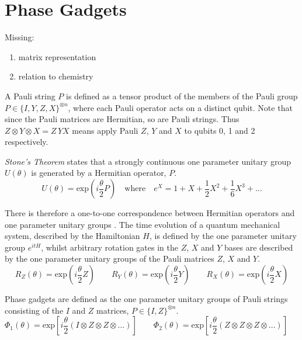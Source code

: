 \section{Phase Gadgets}
Missing:
\begin{enumerate}
    \item matrix representation
    \item relation to chemistry

\end{enumerate}

A Pauli string $P$ is defined as a tensor product of the members of the Pauli group $P \in \{I, Y, Z, X\}^{\otimes n}$, where each Pauli operator acts on a distinct qubit. Note that since the Pauli matrices are Hermitian, so are Pauli strings. Thus $Z \otimes Y \otimes X = Z \, YX$ means apply Pauli $Z$, $Y$ and $X$ to qubits 0, 1 and 2 respectively.

\textit{Stone's Theorem} \cite{Stone1932} states that a strongly continuous one parameter unitary group $U(\theta)$ is generated by a Hermitian operator, $P$.
\begin{equation*}
    U(\theta) = \text{exp}\left(i \frac{\theta}{2} P \right)
    \quad \text{where} \quad
    e^X = 1 + X + \frac{1}{2} X^2 + \frac{1}{6} X^3 + \dots
\end{equation*}

There is therefore a one-to-one correspondence between Hermitian operators and one parameter unitary groups \cite{Yeung2020}. The time evolution of a quantum mechanical system, described by the Hamiltonian $H$, is defined by the one parameter unitary group $e^{itH}$, whilst arbitrary rotation gates in the $Z$, $X$ and $Y$ bases are described by the one parameter unitary groups of the Pauli matrices $Z$, $X$ and $Y$.
\begin{equation*}
    R_Z(\theta) = \text{exp}\left(i \frac{\theta}{2} Z \right) \qquad
    R_Y(\theta) = \text{exp}\left(i \frac{\theta}{2} Y \right) \qquad
    R_X(\theta) = \text{exp}\left(i \frac{\theta}{2} X \right)
\end{equation*}

Phase gadgets are defined as the one parameter unitary groups of Pauli strings consisting of the $I$ and $Z$ matrices, $P \in \{I, Z\}^{\otimes n}$.
\begin{equation*}
    \Phi_1(\theta) = \text{exp} \left[
    i\frac{\theta}{2} (I \otimes Z \otimes Z \otimes \dots)
    \right] \qquad
    \Phi_2(\theta) = \text{exp} \left[
    i\frac{\theta}{2} (Z \otimes Z \otimes Z \otimes \dots)
    \right] \qquad
\end{equation*}

